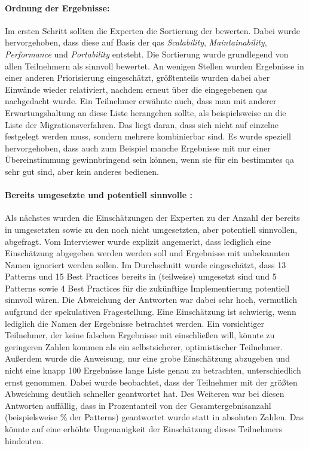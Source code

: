 \paragraph{Ordnung der Ergebnisse:} Im ersten Schritt sollten die Experten die Sortierung der \bpp bewerten.
Dabei wurde hervorgehoben, dass diese auf Basis der \glspl{qa} \emph{Scalability}, \emph{Maintainability}, \emph{Performance} und \emph{Portability} entsteht.
Die Sortierung wurde grundlegend von allen Teilnehmern als sinnvoll bewertet.
An wenigen Stellen wurden Ergebnisse in einer anderen Priorisierung eingeschätzt, größtenteils wurden dabei aber Einwände wieder relativiert, nachdem erneut über die eingegebenen \glspl{qa} nachgedacht wurde.
Ein Teilnehmer erwähnte auch, dass man mit anderer Erwartungshaltung an diese Liste herangehen sollte, als beispielsweise an die Liste der Migrationsverfahren.
Das liegt daran, dass sich nicht auf einzelne \bpp festgelegt werden muss, sondern mehrere kombinierbar sind.
Es wurde speziell hervorgehoben, dass auch zum Beispiel manche Ergebnisse mit nur einer Übereinstimmung gewinnbringend sein können, wenn sie für ein bestimmtes \gls{qa} sehr gut sind, aber kein anderes bedienen.

\paragraph{Bereits umgesetzte und potentiell sinnvolle \bpp:}
Als nächstes wurden die Einschätzungen der Experten zu der Anzahl der bereits in \jf umgesetzten \bpp sowie zu den noch nicht umgesetzten, aber potentiell sinnvollen, abgefragt.
Vom Interviewer wurde explizit angemerkt, dass lediglich eine Einschätzung abgegeben werden werden soll und Ergebnisse mit unbekannten Namen ignoriert werden sollen.
Im Durchschnitt wurde eingeschätzt, dass 13 Patterns und 15 Best Practices bereits in \jf (teilweise) umgesetzt sind und  5 Patterns sowie 4 Best Practices für die zukünftige Implementierung potentiell sinnvoll wären.
Die Abweichung der Antworten war dabei sehr hoch, vermutlich aufgrund der spekulativen Fragestellung.
Eine Einschätzung ist schwierig, wenn lediglich die Namen der Ergebnisse betrachtet werden.
Ein vorsichtiger Teilnehmer, der keine falschen Ergebnisse mit einschließen will, könnte zu geringeren Zahlen kommen als ein selbstsicherer, optimistischer Teilnehmer.
Außerdem wurde die Anweisung, nur eine grobe Einschätzung abzugeben und nicht eine knapp 100 Ergebnisse lange Liste genau zu betrachten, unterschiedlich ernst genommen.
Dabei wurde beobachtet, dass der Teilnehmer mit der größten Abweichung deutlich schneller geantwortet hat.
Des Weiteren war bei diesen Antworten auffällig, dass in Prozentanteil von der Gesamtergebnisanzahl (beispielsweise \% der Patterns\grqq{}) geantwortet wurde statt in absoluten Zahlen.
Das könnte auf eine erhöhte Ungenauigkeit der Einschätzung dieses Teilnehmers hindeuten.

